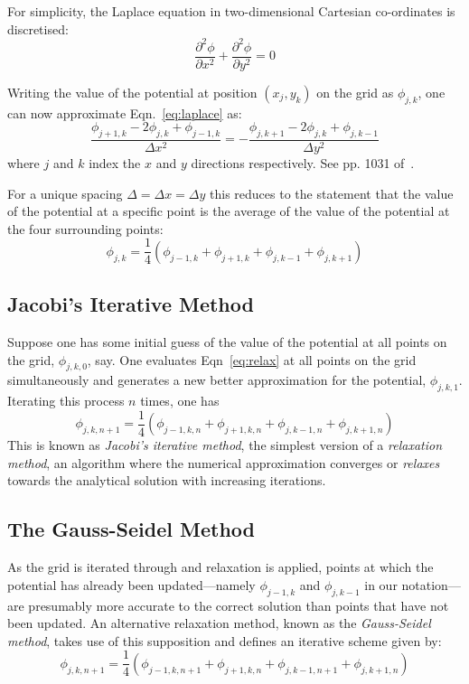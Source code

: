 \documentclass[11pt, a4paper]{article}
\newcommand{\be}{\begin{equation}}
\newcommand{\ee}{\end{equation}}
\begin{document}
For simplicity, the Laplace equation in two-dimensional Cartesian co-ordinates is
discretised:
% 
\be 
\frac{\partial^2 \phi}{\partial x^2}+\frac{\partial^2 \phi}{\partial y^2} = 0
\label{eq:laplace}
\ee 

Writing the value of the potential at position $(x_j,y_k)$ on the grid as $\phi_{j,k}$,
one can now approximate Eqn.~\ref{eq:laplace} as:
% 
\be
\frac{\phi_{j+1,k}-2\phi_{j,k}+\phi_{j-1,k}}{\Delta x^2} = - \frac{\phi_{j,k+1}-2\phi_{j,k}+\phi_{j,k-1}}{\Delta y^2}
\ee
%
where $j$ and $k$ index the $x$ and $y$ directions respectively. See pp. 1031
of~\cite{mm}.

For a unique spacing $\Delta=\Delta x=\Delta y$ this reduces to the statement that
the value of the potential at a specific point is the average of the value of the
potential at the four surrounding points: 
%
\be
\phi_{j,k}= \frac{1}{4}(\phi_{j-1,k}+\phi_{j+1,k}+\phi_{j,k-1}+\phi_{j,k+1})
\label{eq:relax}
\ee

\subsection{Jacobi's Iterative Method}

Suppose one has some initial guess of the value of the potential at all points on the
grid, $\phi_{j,k,0}$, say. One evaluates Eqn~\ref{eq:relax} at all points on the grid
simultaneously and generates a new better approximation for the potential,
$\phi_{j,k,1}$. Iterating this process $n$ times, one has
%
\be
\phi_{j,k,n+1}= \frac{1}{4}(\phi_{j-1,k,n}+\phi_{j+1,k,n}+\phi_{j,k-1,n}+\phi_{j,k+1,n})
\ee
%
This is known as \emph{Jacobi's iterative method}, the simplest version of a
\emph{relaxation method}, an algorithm where the numerical approximation converges or
\emph{relaxes} towards the analytical solution with increasing iterations. 

\subsection{The Gauss-Seidel Method}

As the grid is iterated through and relaxation is applied, points at which the potential
has already been updated---namely $\phi_{j-1,k}$ and $\phi_{j,k-1}$ in our notation---are
presumably more accurate to the correct solution than points that have not been updated.
An alternative relaxation method, known as the \emph{Gauss-Seidel method}, takes use of
this supposition and defines an iterative scheme given by:
%
\be
\phi_{j,k,n+1}= \frac{1}{4}(\phi_{j-1,k,n+1}+\phi_{j+1,k,n}+\phi_{j,k-1,n+1}+\phi_{j,k+1,n})
\ee
\end{document}
